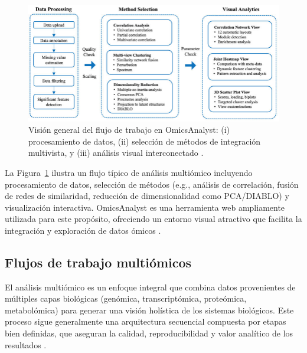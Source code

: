 \begin{figure}[h!]
  \centering
  \includegraphics[scale=0.5]{images/workflow_omicsanalyst.png}
  \caption{Visión general del flujo de trabajo en OmicsAnalyst: (i) procesamiento de datos, (ii) selección de métodos de integración multivista, y (iii) análisis visual interconectado \cite{OmicsAnalyst}.}
  \label{fig:omicsanalyst_1}
\end{figure}

\newpage
La Figura~\ref{fig:omicsanalyst_1} ilustra un flujo típico de análisis multiómico incluyendo procesamiento de datos, selección de métodos (e.g., análisis de correlación, fusión de redes de similaridad, reducción de dimensionalidad como PCA/DIABLO) y visualización interactiva. OmicsAnalyst es una herramienta web ampliamente utilizada para este propósito, ofreciendo un entorno visual atractivo que facilita la integración y exploración de datos ómicos \cite{OmicsAnalyst}.\\





\subsection{Flujos de trabajo multiómicos}
El análisis multiómico es un enfoque integral que combina datos provenientes de múltiples capas biológicas (genómica, transcriptómica, proteómica, metabolómica) para generar una visión holística de los sistemas biológicos. Este proceso sigue generalmente una arquitectura secuencial compuesta por etapas bien definidas, que aseguran la calidad, reproducibilidad y valor analítico de los resultados \cite{hasin2017multiomics_review} \cite{berger2021multiomics_pipeline}.

